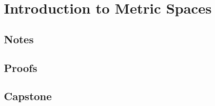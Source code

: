 \chapter{Introduction to Metric Spaces}

\section{Notes}


\clearpage

\section{Proofs}


\section{Capstone}


